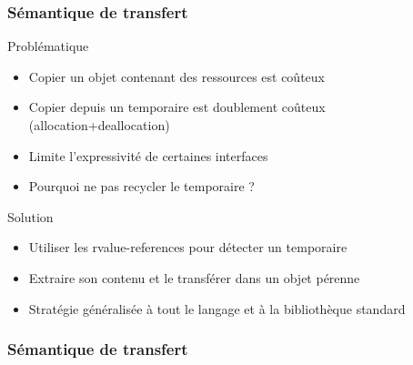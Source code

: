 \documentclass[svgnames]{beamer}
\begin{document}
\frame
{
  \frametitle{Sémantique de transfert}
  \begin{block}{Problématique}
  \begin{itemize}
  \footnotesize
  \item Copier un objet contenant des ressources est coûteux
  \item Copier depuis un temporaire est doublement coûteux (allocation+deallocation)
  \item Limite l'expressivité de certaines interfaces
  \item Pourquoi ne pas recycler le temporaire ?
  \end{itemize}
  \end{block}

  \begin{block}{Solution}
  \begin{itemize}
  \item Utiliser les rvalue-references pour détecter un temporaire
  \item Extraire son contenu et le \alert{transf\'erer} dans un objet pérenne
  \item Stratégie généralisée à tout le langage et \`a la biblioth\`eque standard
  \end{itemize}
  \end{block}
}

\frame
{
  \frametitle{Sémantique de transfert}
  
}
\end{document}
